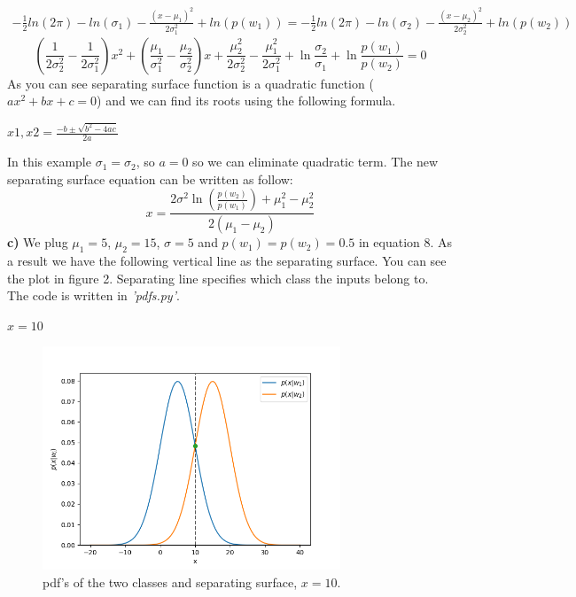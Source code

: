 \documentclass[12pt]{article}
\begin{document}
\begin{gather*}
	-\frac{1}{2}ln(2\pi)-ln(\sigma_{1})-\frac{(x-\mu_{1})^2}{2\sigma_{1}^2}+ln(p(w_{1}))=-\frac{1}{2}ln(2\pi)-ln(\sigma_{2})-\frac{(x-\mu_{2})^2}{2\sigma_{2}^2}+ln(p(w_{2}))
\end{gather*}
\begin{equation}
	\left(\frac{1}{2\sigma_{2}^2}-\frac{1}{2\sigma_{1}^2}\right)x^2+\left(\frac{\mu_{1}}{\sigma_{1}^2}-\frac{\mu_{2}}{\sigma_{2}^2}\right)x+\frac{\mu_{2}^2}{2\sigma_{2}^2}-\frac{\mu_{1}^2}{2\sigma_{1}^2}+\ln\frac{\sigma_{2}}{\sigma_{1}}+\ln\frac{p(w_{1})}{p(w_{2})}=0
\end{equation}
As you can see separating surface function is a quadratic function ($ax^2+bx+c=0$) and we can find its roots using the following formula.
\begin{center}
$x1,x2=\frac{-b\pm\sqrt{b^2-4ac}}{2a}$
\end{center}
In this example $\sigma_{1}=\sigma_{2}$, so $a=0$ so we can eliminate quadratic term. The new separating surface equation can be written as follow:
\begin{equation}
	x=\frac{2\sigma^2\ln\left(\frac{p(w_{2})}{p(w_{1})}\right)+\mu_{1}^2-\mu_{2}^2}{2(\mu_{1}-\mu_{2})}
\end{equation}
\newpage
\textbf{c)} We plug $\mu_{1}=5$, $\mu_{2}=15$, $\sigma=5$ and $p(w_{1})=p(w_{2})=0.5$ in equation 8. As a result we have the following vertical line as the separating surface. You can see the plot in figure 2. Separating line specifies which class the inputs belong to. The code is written in \textit{'pdfs.py'}.
\begin{center}
	$x=10$
\end{center}
\begin{figure}[h]
  \centerline{\includegraphics[width=3.5in]{pdfs.png}}
  \caption{pdf's of the two classes and separating surface, $x=10$.}
  \label{fig:Pdf's of classes pw1=pw2}
\end{figure}
\end{document}
